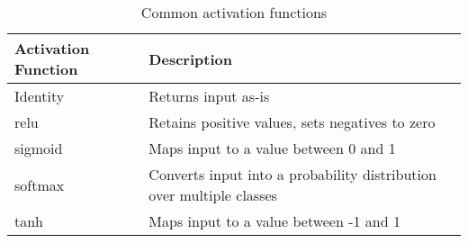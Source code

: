 \begin{table}%
    \centering
    \begin{tabular}{p{4cm}|p{8cm}}
        \textbf{Activation Function} &  \textbf{Description} \\ \hline
        Identity &  Returns input as-is \\
        \gls{relu} & Retains positive values, sets negatives to zero \\
        \gls{sigmoid} & Maps input to a value between 0 and 1 \\
        \gls{softmax} & Converts input into a probability distribution over multiple classes \\
        \gls{tanh} & Maps input to a value between -1 and 1 \\
    \end{tabular}
    \caption{Common activation functions}
    \label{tab:02_nn_common_activation_functions}
\end{table}
